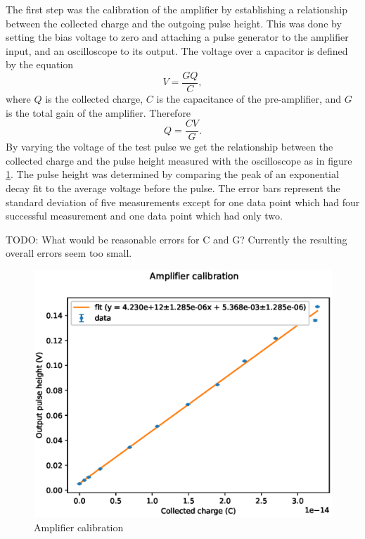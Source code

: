 \documentclass[a4paper]{article}
\begin{document}
The first step was the calibration of the amplifier by establishing a relationship between the collected charge and the outgoing pulse height.
This was done by setting the bias voltage to zero and attaching a pulse generator to the amplifier input, and an oscilloscope to its output.
The voltage over a capacitor is defined by the equation
\begin{equation}
V = \frac{GQ}{C},
\end{equation}
where $Q$ is the collected charge, $C$ is the capacitance of the pre-amplifier, and $G$ is the total gain of the amplifier.
Therefore 
\begin{equation}
Q = \frac{CV}{G}.
\end{equation}
By varying the voltage of the test pulse we get the relationship between the collected charge and the pulse height measured with the oscilloscope as in figure \ref{fig:amp_calibration}.
The pulse height was determined by comparing the peak of an exponential decay fit to the average voltage before the pulse.
The error bars represent the standard deviation of five measurements except for one data point which had four successful measurement and one data point which had only two.

TODO: What would be reasonable errors for C and G? Currently the resulting overall errors seem too small.

\begin{figure}[ht!]
\centering
\includegraphics[width=\textwidth]{fig/python/amp_calibration.eps}
\caption{Amplifier calibration}
\label{fig:amp_calibration}
\end{figure}
\end{document}
